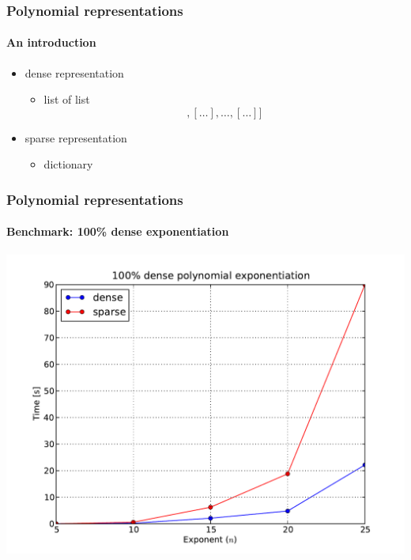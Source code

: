 \documentclass{beamer}
\begin{document}
\begin{frame}
    \frametitle{Polynomial representations}
    \framesubtitle{An introduction}

    \begin{itemize}
        \item dense representation
            \begin{itemize}
                \item list of list
                \begin{equation*}
                    [[\ldots], [\ldots], \ldots, [\ldots]]
                \end{equation*}
            \end{itemize}
        \item sparse representation
            \begin{itemize}
                \item dictionary
                \begin{equation*}
                    [(M_n, c_n), (M_{n-1}, c_{n-1}) \ldots, (M_0, c_0)]
                \end{equation*}
            \end{itemize}
    \end{itemize}
\end{frame}

\begin{frame}
    \frametitle{Polynomial representations}
    \framesubtitle{Benchmark: 100\% dense exponentiation}

    \begin{center}
        \includegraphics[scale=0.45]{images/100-dense-power.pdf}
    \end{center}
\end{frame}
\end{document}
